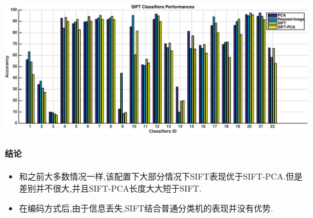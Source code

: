 	\begin{center}
	\begin{minipage}[t]{\linewidth}
	\center
	{
	\captionsetup{justification=centering}
	\includegraphics[width=\textwidth]{Img/c3/pni_sift_res} 
	}
	\end{minipage}
	\medskip
	\end{center}
\paragraph{结论}
\begin{itemize}
	\item 和之前大多数情况一样,该配置下大部分情况下SIFT表现优于SIFT-PCA.但是差别并不很大,并且SIFT-PCA长度大大短于SIFT.
	\item 在编码方式后,由于信息丢失,SIFT结合普通分类机的表现并没有优势.
\end{itemize}

%

